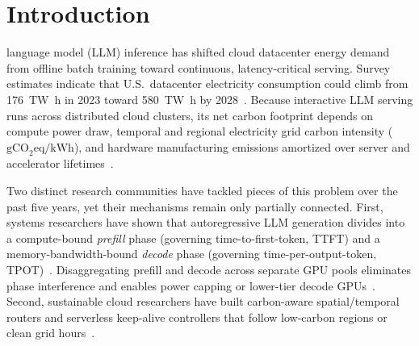\section{Introduction}\label{sec:intro}

 language model (LLM) inference has shifted cloud datacenter energy demand from offline batch training toward continuous, latency-critical serving. Survey estimates indicate that U.S.\ datacenter electricity consumption could climb from \SI{176}{\tera\watt\hour} in 2023 toward \SI{580}{\tera\watt\hour} by 2028~\cite{yang2025container}. Because interactive LLM serving runs across distributed cloud clusters, its net carbon footprint depends on compute power draw, temporal and regional electricity grid carbon intensity ($\text{gCO}_2\text{eq/kWh}$), and hardware manufacturing emissions amortized over server and accelerator lifetimes~\cite{gupta2021chasing,iso2024sci}.

Two distinct research communities have tackled pieces of this problem over the past five years, yet their mechanisms remain only partially connected. First, systems researchers have shown that autoregressive LLM generation divides into a compute-bound \emph{prefill} phase (governing time-to-first-token, TTFT) and a memory-bandwidth-bound \emph{decode} phase (governing time-per-output-token, TPOT)~\cite{patel2024splitwise,zhong2024distserve,agrawal2024sarathi}. Disaggregating prefill and decode across separate GPU pools eliminates phase interference and enables power capping or lower-tier decode GPUs~\cite{patel2024splitwise,stojkovic2025dynamollm,basit2026dualscale,yan2026pdprov}. Second, sustainable cloud researchers have built carbon-aware spatial/temporal routers and serverless keep-alive controllers that follow low-carbon regions or clean grid hours~\cite{wiesner2021letswait,hanafy2023carbonscaler,sukprasert2024limitations,gsteiger2024caribou,sun2026lacere}.

